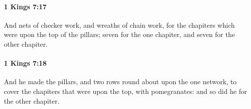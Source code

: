 		\paragraph{1 Kings 7:17} %
			\label{1KINGS-7-17}

			And nets of checker work, and wreaths of chain work, for the chapiters which were upon the top of the pillars; seven for the one chapiter, and seven for the other chapiter.


		\paragraph{1 Kings 7:18} %
			\label{1KINGS-7-18}

			And he made the pillars, and two rows round about upon the one network, to cover the chapiters that were upon the top, with pomegranates: and so did he for the other chapiter.


